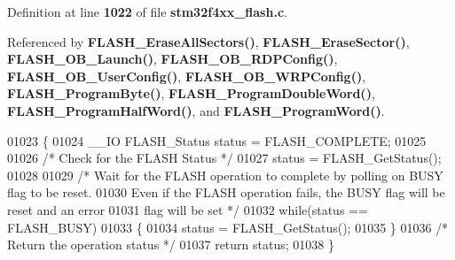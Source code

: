 Definition at line \textbf{ 1022} of file \textbf{ stm32f4xx\+\_\+flash.\+c}.



Referenced by \textbf{ F\+L\+A\+S\+H\+\_\+\+Erase\+All\+Sectors()}, \textbf{ F\+L\+A\+S\+H\+\_\+\+Erase\+Sector()}, \textbf{ F\+L\+A\+S\+H\+\_\+\+O\+B\+\_\+\+Launch()}, \textbf{ F\+L\+A\+S\+H\+\_\+\+O\+B\+\_\+\+R\+D\+P\+Config()}, \textbf{ F\+L\+A\+S\+H\+\_\+\+O\+B\+\_\+\+User\+Config()}, \textbf{ F\+L\+A\+S\+H\+\_\+\+O\+B\+\_\+\+W\+R\+P\+Config()}, \textbf{ F\+L\+A\+S\+H\+\_\+\+Program\+Byte()}, \textbf{ F\+L\+A\+S\+H\+\_\+\+Program\+Double\+Word()}, \textbf{ F\+L\+A\+S\+H\+\_\+\+Program\+Half\+Word()}, and \textbf{ F\+L\+A\+S\+H\+\_\+\+Program\+Word()}.


\begin{DoxyCode}
01023 \{ 
01024   \_\_IO FLASH_Status status = FLASH_COMPLETE;
01025    
01026   \textcolor{comment}{/* Check for the FLASH Status */}
01027   status = FLASH_GetStatus();
01028 
01029   \textcolor{comment}{/* Wait for the FLASH operation to complete by polling on BUSY flag to be reset.}
01030 \textcolor{comment}{     Even if the FLASH operation fails, the BUSY flag will be reset and an error}
01031 \textcolor{comment}{     flag will be set */}
01032   \textcolor{keywordflow}{while}(status == FLASH_BUSY)
01033   \{
01034     status = FLASH_GetStatus();
01035   \}
01036   \textcolor{comment}{/* Return the operation status */}
01037   \textcolor{keywordflow}{return} status;
01038 \}
\end{DoxyCode}
